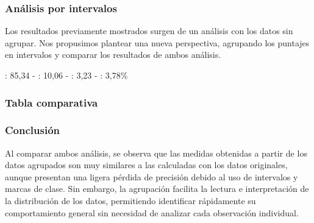 
\subsubsection{Análisis por intervalos}
Los resultados previamente mostrados surgen de un análisis con los datos sin agrupar. Nos propusimos
plantear una nueva perspectiva, agrupando los puntajes en intervalos y comparar los resultados de
ambos análisis.


: 85,34 -
: 10,06 -
: 3,23 -
: 3,78\%



\subsubsection{Tabla comparativa}


\subsubsection{Conclusión}
Al comparar ambos análisis, se observa que las medidas obtenidas a partir de los datos agrupados son
muy similares a las calculadas con los datos originales, aunque presentan una ligera pérdida de
precisión debido al uso de intervalos y marcas de clase. Sin embargo, la agrupación facilita la
lectura e interpretación de la distribución de los datos, permitiendo identificar rápidamente su
comportamiento general sin necesidad de analizar cada observación individual.
